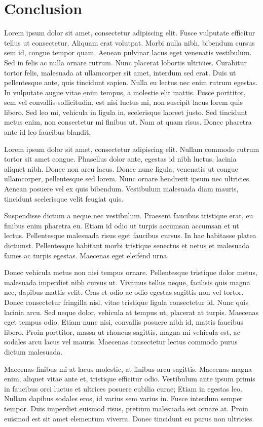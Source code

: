 \chapter{Conclusion}
\label{ch:conclusion}

Lorem ipsum dolor sit amet, consectetur adipiscing elit. Fusce vulputate efficitur tellus ut consectetur. Aliquam erat volutpat. Morbi nulla nibh, bibendum cursus sem id, congue tempor quam. Aenean pulvinar lacus eget venenatis vestibulum. Sed in felis ac nulla ornare rutrum. Nunc placerat lobortis ultricies. Curabitur tortor felis, malesuada at ullamcorper sit amet, interdum sed erat. Duis ut pellentesque ante, quis tincidunt sapien. Nulla eu lectus nec enim rutrum egestas. In vulputate augue vitae enim tempus, a molestie elit mattis. Fusce porttitor, sem vel convallis sollicitudin, est nisi luctus mi, non suscipit lacus lorem quis libero. Sed leo mi, vehicula in ligula in, scelerisque laoreet justo. Sed tincidunt metus enim, non consectetur mi finibus ut. Nam at quam risus. Donec pharetra ante id leo faucibus blandit.

Lorem ipsum dolor sit amet, consectetur adipiscing elit. Nullam commodo rutrum tortor sit amet congue. Phasellus dolor ante, egestas id nibh luctus, lacinia aliquet nibh. Donec non arcu lacus. Donec nunc ligula, venenatis ut congue ullamcorper, pellentesque sed lorem. Nunc ornare hendrerit ipsum nec ultricies. Aenean posuere vel ex quis bibendum. Vestibulum malesuada diam mauris, tincidunt scelerisque velit feugiat quis.

Suspendisse dictum a neque nec vestibulum. Praesent faucibus tristique erat, eu finibus enim pharetra eu. Etiam id odio ut turpis accumsan accumsan et ut lectus. Pellentesque malesuada risus eget faucibus cursus. In hac habitasse platea dictumst. Pellentesque habitant morbi tristique senectus et netus et malesuada fames ac turpis egestas. Maecenas eget eleifend urna.

Donec vehicula metus non nisi tempus ornare. Pellentesque tristique dolor metus, malesuada imperdiet nibh cursus ut. Vivamus tellus neque, facilisis quis magna nec, dapibus mattis velit. Cras et odio ac odio egestas sagittis non vel tortor. Donec consectetur fringilla nisl, vitae tristique ligula consectetur id. Nunc quis lacinia arcu. Sed neque dolor, vehicula at tempus ut, placerat at turpis. Maecenas eget tempus odio. Etiam nunc nisi, convallis posuere nibh id, mattis faucibus libero. Proin porttitor, massa ut rhoncus sagittis, magna mi vehicula est, ac sodales arcu lacus vel mauris. Maecenas consectetur lectus commodo purus dictum malesuada.

Maecenas finibus mi at lacus molestie, at finibus arcu sagittis. Maecenas magna enim, aliquet vitae ante et, tristique efficitur odio. Vestibulum ante ipsum primis in faucibus orci luctus et ultrices posuere cubilia curae; Etiam in egestas leo. Nullam dapibus sodales eros, id varius sem varius in. Fusce interdum semper tempor. Duis imperdiet euismod risus, pretium malesuada est ornare at. Proin euismod est sit amet elementum viverra. Donec tincidunt eu purus non ultricies.

